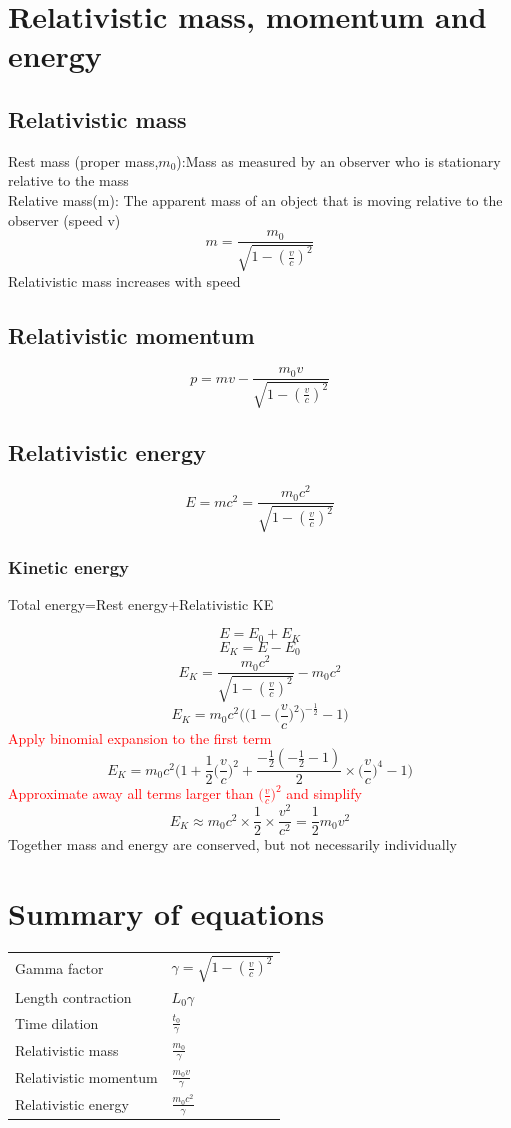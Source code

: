 \documentclass[12pt]{article}
\begin{document}
\section{Relativistic mass, momentum and energy}
\subsection{Relativistic mass}
Rest mass (proper mass,$m_0$):Mass as measured by an observer who is stationary relative to the mass\\
Relative mass(m): The apparent mass of an object that is moving relative to the observer (speed v)\\
$$m=\frac{m_0}{\sqrt{1-(\frac{v}{c})^2}}$$
Relativistic mass increases with speed
\newpage
\subsection{Relativistic momentum}
$$p=mv-\frac{m_0v}{\sqrt{1-(\frac{v}{c})^2}}$$
\subsection{Relativistic energy}
$$E=mc^2=\frac{m_0c^2}{\sqrt{1-(\frac{v}{c})^2}}$$
\subsubsection{Kinetic energy}
\begin{center}
Total energy=Rest energy+Relativistic KE
\end{center}
$$E=E_0+E_K$$
$$E_K=E-E_0$$
$$E_K=\frac{m_0c^2}{\sqrt{1-(\frac{v}{c})^2}}-m_0c^2$$
$$E_K=m_0c^2\Bigg(\bigg(1-\bigg(\frac{v}{c}\bigg)^2\bigg)^{-\frac{1}{2}}-1\Bigg)$$
\textcolor{red}{Apply binomial expansion to the first term}
$$E_K=m_0c^2\Bigg(1+\frac{1}{2}\Big(\frac{v}{c}\Big)^2+\frac{-\frac{1}{2}(-\frac{1}{2}-1)}{2}\times\Big(\frac{v}{c}\Big)^4-1\Bigg)$$
\textcolor{red}{Approximate away all terms larger than $\Big(\frac{v}{c}\Big)^2$ and simplify}
$$E_K\approx m_0c^2\times\frac{1}{2}\times\frac{v^2}{c^2}=\frac{1}{2}m_0v^2$$
Together mass and energy are conserved, but not necessarily individually
\section{Summary of equations}
{\renewcommand{\arraystretch}{2}
\begin{tabular}{l l}
Gamma factor&$\gamma=\sqrt{1-(\frac{v}{c})^2}$\\
Length contraction&$L_0\gamma$\\
Time dilation&\Large{$\frac{t_0}{\gamma}$}\\
Relativistic mass&\Large{$\frac{m_0}{\gamma}$}\\
Relativistic momentum&\Large{$\frac{m_0v}{\gamma}$}\\
Relativistic energy&\Large{$\frac{m_0c^2}{\gamma}$}
\end{tabular}}
\newpage
\end{document}
